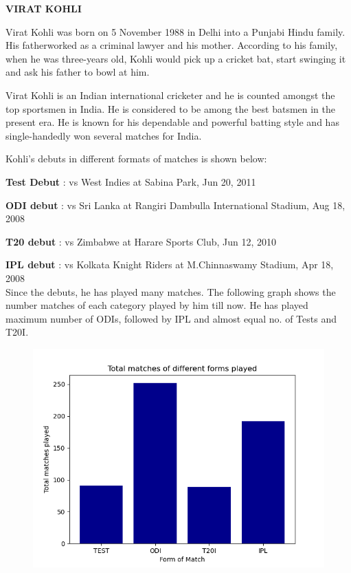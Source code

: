 \documentclass[12pt]{article}
\begin{document}
\noindent

\onehalfspacing
\thispagestyle{plain}

\begin{center}
\rule{0mm}{40mm}%
    {\Huge \textbf{VIRAT KOHLI}}
\end{center}
\rule{0mm}{15mm}%
    Virat Kohli was born on 5 November 1988 in Delhi into a Punjabi Hindu family. His fatherworked as a criminal lawyer and his mother. According to his family, when he was three-years old, Kohli would pick up a cricket bat, start swinging it and ask his father to bowl at him.


    Virat Kohli is an Indian international cricketer and he is counted amongst the top sportsmen in India. He is considered to be among the best batsmen in the present era. He is known for his dependable and powerful batting style and has single-handedly won several matches for India. 

\newpage
    
    Kohli's debuts in different formats of matches is shown below:
    
    \textbf{Test Debut} : vs West Indies at Sabina Park, Jun 20, 2011
    
    \textbf{ODI debut} : vs Sri Lanka at Rangiri Dambulla International Stadium, Aug 18, 2008
    
    \textbf{T20 debut} :  vs Zimbabwe at Harare Sports Club, Jun 12, 2010
    
    \textbf{IPL debut} : vs Kolkata Knight Riders at M.Chinnaswamy Stadium, Apr 18, 2008\\
    
    Since the debuts, he has played many matches. The following graph shows the number matches of each category played by him till now. He has played maximum number of ODIs, followed by IPL and almost equal no. of Tests and T20I.

\begin{figure}[h]
\begin{center}
\includegraphics[width=1\linewidth]{assign/Bar.png}
\end{center}
\end{figure}
\newpage
\end{document}

